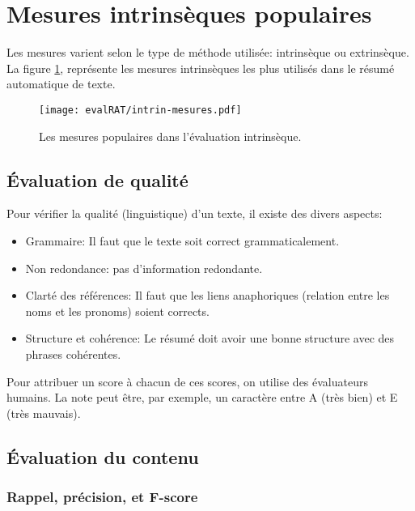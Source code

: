 \documentclass[a4paper,12pt,oneside]{../use/ESIthesis}
\begin{document}
\section{Mesures intrinsèques populaires}

Les mesures varient selon le type de méthode utilisée: intrinsèque ou extrinsèque. 
La figure \ref{fig:intrin-mesures}, représente les mesures intrinsèques les plus utilisés dans le résumé automatique de texte. 
%
\begin{figure}[ht]
\begin{center}
\texttt{[image: evalRAT/intrin-mesures.pdf]} %
 \caption{Les mesures populaires dans l'évaluation intrinsèque.}
 \label{fig:intrin-mesures}
\end{center}
\end{figure}

\subsection{Évaluation de qualité}

Pour vérifier la qualité (linguistique) d'un texte, il existe des divers aspects:
\begin{itemize}
\item Grammaire: Il faut que le texte soit correct grammaticalement.
\item Non redondance: pas d'information redondante.
\item Clarté des références: Il faut que les liens anaphoriques (relation entre les noms et les pronoms) soient corrects.
\item Structure et cohérence: Le résumé doit avoir une bonne structure avec des phrases cohérentes.
\end{itemize}
Pour attribuer un score à chacun de ces scores, on utilise des évaluateurs humains.
La note peut être, par exemple, un caractère entre A (très bien) et E (très mauvais).

\subsection{Évaluation du contenu}

\subsubsection{Rappel, précision, et F-score}
\end{document}

